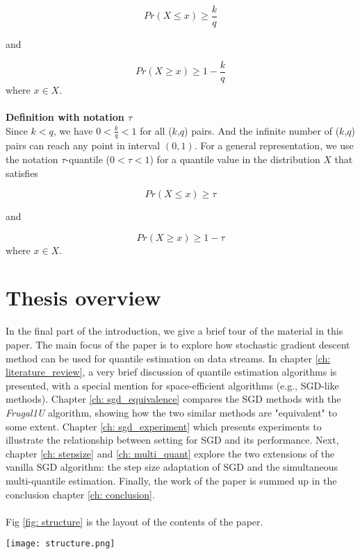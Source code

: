     \begin{equation}
        Pr(X \leq x) \geq \frac{k}{q}
    \end{equation}
    
    and
    
    \begin{equation}
        Pr(X \geq x) \geq 1 - \frac{k}{q}
    \end{equation}
    where $x \in X$.
    \\\\
    \textbf{Definition with notation $\tau$}\\
    Since $k < q$, we have $0 < \frac{k}{q} < 1$ for all ($k$,$q$) pairs. And the infinite number of ($k$,$q$) pairs can reach any point in interval $(0,1)$. For a general representation, we use the notation $\tau$-quantile ($0 < \tau < 1$) for a quantile value in the distribution $X$ that satisfies

    \begin{equation}
        Pr(X \leq x) \geq \tau
    \end{equation}
    
    and
    
    \begin{equation}
        Pr(X \geq x) \geq 1 - \tau
    \end{equation}
    where $x \in X$.

\section{Thesis overview}
\label{sec: intro_overview}
In the final part of the introduction, we give a brief tour of the material in this paper.
The main focus of the paper is to explore how stochastic gradient descent method can be used for quantile estimation on data streams.
In chapter \ref{ch: literature_review}, a very brief discussion of quantile estimation algorithms is presented, with a special mention for space-efficient algorithms (e.g., SGD-like methods). 
Chapter \ref{ch: sgd_equivalence} compares the SGD methods with the \textit{Frugal1U} algorithm\cite{maFrugalStreamingEstimating2014}, showing how the two similar methods are "equivalent" to some extent.
Chapter \ref{ch: sgd_experiment} which presents experiments to illustrate the relationship between setting for SGD and its performance.
Next, chapter \ref{ch: stepsize} and \ref{ch: multi_quant} explore the two extensions of the vanilla SGD algorithm: the step size adaptation of SGD and the simultaneous multi-quantile estimation. Finally, the work of the paper is summed up in the conclusion chapter \ref{ch: conclusion}.
\\\\
Fig \ref{fig: structure} is the layout of the contents of the paper.

\begin{figure*}[h!]
    \centering
	\texttt{[image: structure.png]}
    \caption{The relationship between topics covered in the thesis. Topics are roughly positioned along the top-bottom axis depending on where they are more close to SGD methods (left) or non-SGD methods (right). The arrows between the chapters represent are connected according to dependence.}
    \label{fig: structure}
\end{figure*}
